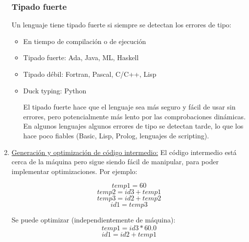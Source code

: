 \documentclass[10pt,a4paper]{report}
\begin{document}
\begin{enumerate}
		\subsubsection{Tipado fuerte}
			
		\par Un lenguaje tiene tipado fuerte si siempre se detectan los errores 
		de tipo:
		\begin{itemize}
			\item En tiempo de compilación o de ejecución
			\item Tipado fuerte: Ada, Java, ML, Haskell
			\item Tipado débil: Fortran, Pascal, C/C++, Lisp 
			\item Duck typing: Python
		
		\par El tipado fuerte hace que el lenguaje sea más seguro y fácil de 
		usar sin errores, pero potencialmente más lento por las 
		comprobaciones dinámicas. En algunos lenguajes algunos errores de 
		tipo se detectan tarde, lo que los hace poco fiables (Basic, Lisp, 
		Prolog, lenguajes de scripting).
		\end{itemize}
		
	\item \underline{Generación y optimización de código intermedio:} El código 
	intermedio está cerca de la máquina pero sigue siendo fácil de manipular, 
	para poder implementar optimizaciones. Por ejemplo:
	
	\begin{equation}
	 temp1 = 60
	 \end{equation}
	 \begin{equation}
     temp2 = id3 + temp1
     \end{equation}
     \begin{equation}
     temp3 = id2 + temp2
     \end{equation}
     \begin{equation}
     id1 = temp3 
     \end{equation}

	\par Se puede optimizar (independientemente de máquina):
     \begin{equation}
     temp1 = id3 * 60.0
     \end{equation}
     \begin{equation}
     id1 = id2 + temp1 
		\end{equation}


\end{enumerate}
\end{document}
